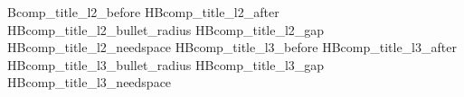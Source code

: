 
\expandafter\providecommand\csname HBcomp_title_l2_before\endcsname{1.2mm}
\expandafter\providecommand\csname HBcomp_title_l2_after\endcsname{1.4mm}
\expandafter\providecommand\csname HBcomp_title_l2_bullet_radius\endcsname{0.75mm}
\expandafter\providecommand\csname HBcomp_title_l2_gap\endcsname{1.4mm}
\expandafter\providecommand\csname HBcomp_title_l2_needspace\endcsname{10mm}
\expandafter\providecommand\csname HBcomp_title_l3_before\endcsname{0.8mm}
\expandafter\providecommand\csname HBcomp_title_l3_after\endcsname{0.6mm}
\expandafter\providecommand\csname HBcomp_title_l3_bullet_radius\endcsname{0.28mm}
\expandafter\providecommand\csname HBcomp_title_l3_gap\endcsname{0.9mm}
\expandafter\providecommand\csname HBcomp_title_l3_needspace\endcsname{8mm}

\providecommand{\HBTitleLevelTwoMarker}{%
  \tikz[baseline=-0.45ex]{%
    \fill[\csname HBtype_title_l2_color\endcsname]
      (0,0) circle[radius=\csname HBcomp_title_l2_bullet_radius\endcsname];%
  }%
}

\providecommand{\HBTitleLevelTwo}[1]{%
  \noindent
  \begingroup
    \HBTitleLevelTwoMarker
    \hspace{\csname HBcomp_title_l2_gap\endcsname}%
    \HBTypeTitleLevelTwo{#1}%
    \par
  \endgroup
}

\providecommand{\HBTitleLevelTwoBlock}[1]{%
  \par\vspace{\csname HBcomp_title_l2_before\endcsname}%
  \Needspace{\csname HBcomp_title_l2_needspace\endcsname}%
  \HBTitleLevelTwo{#1}%
  \vspace{\csname HBcomp_title_l2_after\endcsname}%
}

\providecommand{\HBLevelTwoTitle}[1]{%
  \HBTitleLevelTwoBlock{#1}%
}

\providecommand{\HBTitleLevelThreeMarker}{%
  \tikz[baseline=-0.45ex]{%
    \fill[\csname HBtype_title_l3_color\endcsname]
      (0,0) circle[radius=\csname HBcomp_title_l3_bullet_radius\endcsname];%
  }%
}

\providecommand{\HBTitleLevelThree}[1]{%
  \noindent
  \begingroup
    \HBTitleLevelThreeMarker
    \hspace{\csname HBcomp_title_l3_gap\endcsname}%
    \HBTypeTitleLevelThree{#1}%
    \par
  \endgroup
}

